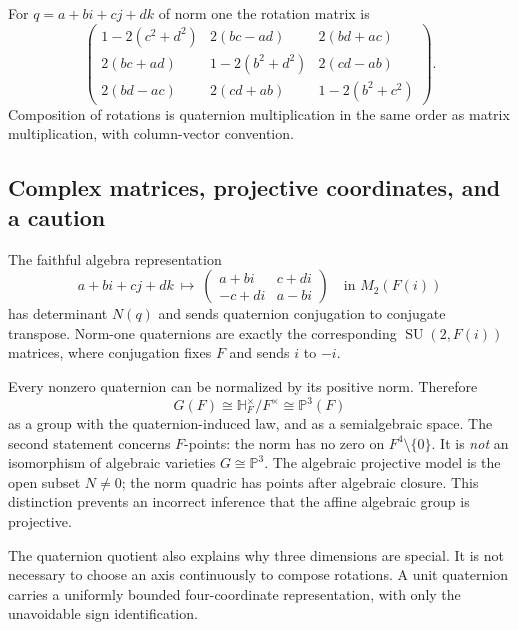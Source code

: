 \documentclass[11pt,letterpaper]{article}
\numberwithin{equation}{section}
\theoremstyle{definition}
\theoremstyle{remark}
\newcommand{\HH}{\mathbb H}
\newcommand{\SU}{\operatorname{SU}}
\begin{document}
For \(q=a+bi+cj+dk\) of norm one the rotation matrix is
\begin{equation}\label{e3:so:eq:qmatrix}
\begin{pmatrix}
1-2(c^2+d^2)&2(bc-ad)&2(bd+ac)\\
2(bc+ad)&1-2(b^2+d^2)&2(cd-ab)\\
2(bd-ac)&2(cd+ab)&1-2(b^2+c^2)
\end{pmatrix}.
\end{equation}
Composition of rotations is quaternion multiplication in the same order as
matrix multiplication, with column-vector convention.

\subsection{Complex matrices, projective coordinates, and a caution}

The faithful algebra representation
\begin{equation}\label{e3:so:eq:su2}
 a+bi+cj+dk\ \longmapsto\
 \begin{pmatrix}a+bi&c+di\\-c+di&a-bi\end{pmatrix}
 \quad\text{in }M_2(F(i))
\end{equation}
has determinant \(N(q)\) and sends quaternion conjugation to conjugate
transpose. Norm-one quaternions are exactly the corresponding \(\SU(2,F(i))\)
matrices, where conjugation fixes \(F\) and sends \(i\) to \(-i\).

Every nonzero quaternion can be normalized by its positive norm. Therefore
\begin{equation}\label{e3:so:eq:projective}
 G(F)\cong\HH_F^\times/F^\times
       \cong\mathbb P^3(F)
\end{equation}
as a group with the quaternion-induced law, and as a semialgebraic space.
The second statement concerns \(F\)-points: the norm has no zero on
\(F^4\setminus\{0\}\). It is \emph{not} an isomorphism of algebraic varieties
\(G\cong\mathbb P^3\). The algebraic projective model is the open subset
\(N\ne0\); the norm quadric has points after algebraic closure. This distinction
prevents an incorrect inference that the affine algebraic group is projective.

The quaternion quotient also explains why three dimensions are special. It is
not necessary to choose an axis continuously to compose rotations. A unit
quaternion carries a uniformly bounded four-coordinate representation, with
only the unavoidable sign identification.
\end{document}
